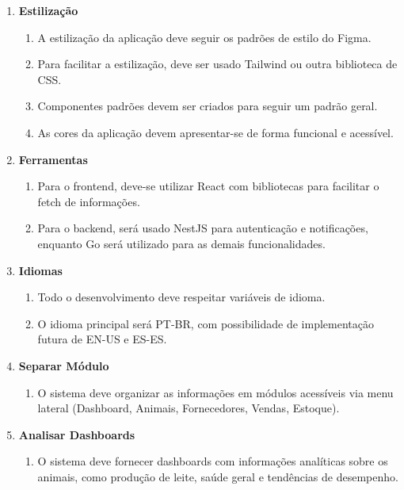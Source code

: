 \documentclass[12pt, a4paper]{article}
\begin{document}
\begin{spacing}{1.5}
\begin{enumerate}[label=RNF0\arabic{*}.]
    \item \textbf{Estilização}
    \begin{enumerate}[label=RNF01.0\arabic{*}]
        \item A estilização da aplicação deve seguir os padrões de estilo do Figma.
        \item Para facilitar a estilização, deve ser usado Tailwind ou outra biblioteca de CSS.
        \item Componentes padrões devem ser criados para seguir um padrão geral.
        \item As cores da aplicação devem apresentar-se de forma funcional e acessível.
    \end{enumerate}
    \item \textbf{Ferramentas}
    \begin{enumerate}[label=RNF02.0\arabic{*}]
        \item Para o frontend, deve-se utilizar React com bibliotecas para facilitar o fetch de informações.
        \item Para o backend, será usado NestJS para autenticação e notificações, enquanto Go será utilizado para as demais funcionalidades.
    \end{enumerate}
    \item \textbf{Idiomas}
    \begin{enumerate}[label=RNF03.0\arabic{*}]
        \item Todo o desenvolvimento deve respeitar variáveis de idioma.
        \item O idioma principal será PT-BR, com possibilidade de implementação futura de EN-US e ES-ES.
    \end{enumerate}
    \item \textbf{Separar Módulo}
    \begin{enumerate}[label=RF04.0\arabic{*}]
        \item O sistema deve organizar as informações em módulos acessíveis via menu lateral (Dashboard, Animais, Fornecedores, Vendas, Estoque).
    \end{enumerate}
    \item \textbf{Analisar Dashboards}
    \begin{enumerate}[label=RF05.0\arabic{*}]
        \item O sistema deve fornecer dashboards com informações analíticas sobre os animais, como produção de leite, saúde geral e tendências de desempenho.
    \end{enumerate}
\end{enumerate}
\end{spacing}
\end{document}
